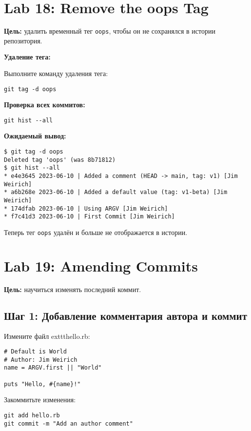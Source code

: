 \documentclass[a4paper,12pt]{report}
\begin{document}
\section{Lab 18: Remove the oops Tag}
\textbf{Цель:} удалить временный тег \texttt{oops}, чтобы он не сохранялся в истории репозитория.

\textbf{Удаление тега:}

Выполните команду удаления тега:
\begin{verbatim}
git tag -d oops
\end{verbatim}

\textbf{Проверка всех коммитов:}

\begin{verbatim}
git hist --all
\end{verbatim}

\textbf{Ожидаемый вывод:}
\begin{verbatim}
$ git tag -d oops
Deleted tag 'oops' (was 8b71812)
$ git hist --all
* e4e3645 2023-06-10 | Added a comment (HEAD -> main, tag: v1) [Jim Weirich]
* a6b268e 2023-06-10 | Added a default value (tag: v1-beta) [Jim Weirich]
* 174dfab 2023-06-10 | Using ARGV [Jim Weirich]
* f7c41d3 2023-06-10 | First Commit [Jim Weirich]
\end{verbatim}

Теперь тег \texttt{oops} удалён и больше не отображается в истории.


\section{Lab 19: Amending Commits}

\textbf{Цель:} научиться изменять последний коммит.

\subsection*{Шаг 1: Добавление комментария автора и коммит}

Измените файл 	exttt{hello.rb}:
\begin{verbatim}
# Default is World
# Author: Jim Weirich
name = ARGV.first || "World"

puts "Hello, #{name}!"
\end{verbatim}

Закоммитьте изменения:
\begin{verbatim}
git add hello.rb
git commit -m "Add an author comment"
\end{verbatim}
\end{document}
